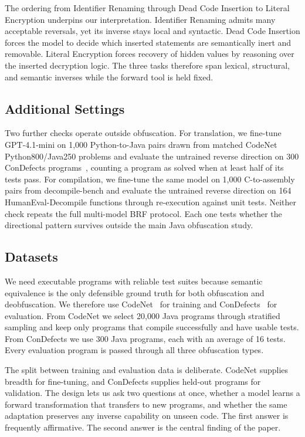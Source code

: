 

The ordering from Identifier Renaming through Dead Code Insertion to Literal
Encryption underpins our interpretation. Identifier Renaming admits many
acceptable reversals, yet its inverse stays local and syntactic. Dead Code
Insertion forces the model to decide which inserted statements are semantically
inert and removable. Literal Encryption forces recovery of hidden values by
reasoning over the inserted decryption logic. The three tasks therefore span
lexical, structural, and semantic inverses while the forward tool is held
fixed.

\subsection{Additional Settings}
\label{sec:additional_settings}

Two further checks operate outside obfuscation. For translation, we fine-tune
GPT-4.1-mini on 1{,}000 Python-to-Java pairs drawn from matched CodeNet
Python800/Java250 problems and evaluate the untrained reverse direction on
300 ConDefects programs~\cite{condefects}, counting a program as solved when at least
half of its tests pass. For compilation, we fine-tune the same model on 1{,}000
C-to-assembly pairs from decompile-bench and evaluate the untrained reverse
direction on 164 HumanEval-Decompile functions through re-execution against unit
tests. Neither check repeats the full multi-model BRF protocol. Each one tests
whether the directional pattern survives outside the main Java obfuscation
study.

\subsection{Datasets}
\label{sec:datasets}

We need executable programs with reliable test suites because semantic
equivalence is the only defensible ground truth for both obfuscation and
deobfuscation. We therefore use CodeNet~\cite{puri2021codenet} for training and
ConDefects~\cite{condefects} for evaluation. From CodeNet we select
20{,}000 Java programs through stratified sampling and keep only programs that
compile successfully and have usable tests. 
From ConDefects we use 300 Java
programs, each with an average of 16 tests. Every evaluation program is passed
through all three obfuscation types.

The split between training and evaluation data is deliberate. CodeNet supplies
breadth for fine-tuning, and ConDefects supplies held-out programs for
validation. The design lets us ask two questions at once, whether a model learns
a forward transformation that transfers to new programs, and whether the same
adaptation preserves any inverse capability on unseen code. The first answer is
frequently affirmative. The second answer is the central finding of the paper.

